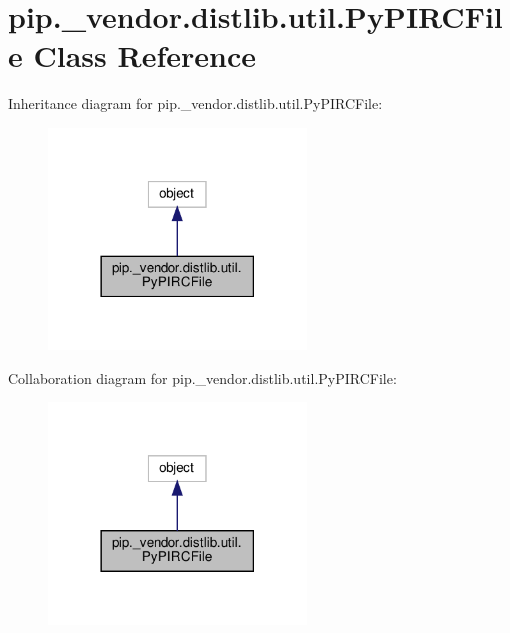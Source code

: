 \hypertarget{classpip_1_1__vendor_1_1distlib_1_1util_1_1PyPIRCFile}{}\section{pip.\+\_\+vendor.\+distlib.\+util.\+Py\+P\+I\+R\+C\+File Class Reference}
\label{classpip_1_1__vendor_1_1distlib_1_1util_1_1PyPIRCFile}


Inheritance diagram for pip.\+\_\+vendor.\+distlib.\+util.\+Py\+P\+I\+R\+C\+File\+:
\nopagebreak
\begin{figure}[H]
\begin{center}
\leavevmode
\includegraphics[width=194pt]{classpip_1_1__vendor_1_1distlib_1_1util_1_1PyPIRCFile__inherit__graph}
\end{center}
\end{figure}


Collaboration diagram for pip.\+\_\+vendor.\+distlib.\+util.\+Py\+P\+I\+R\+C\+File\+:
\nopagebreak
\begin{figure}[H]
\begin{center}
\leavevmode
\includegraphics[width=194pt]{classpip_1_1__vendor_1_1distlib_1_1util_1_1PyPIRCFile__coll__graph}
\end{center}
\end{figure}
